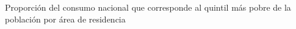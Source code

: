 Proporción del consumo nacional que corresponde al quintil más pobre de la población por área de residencia
